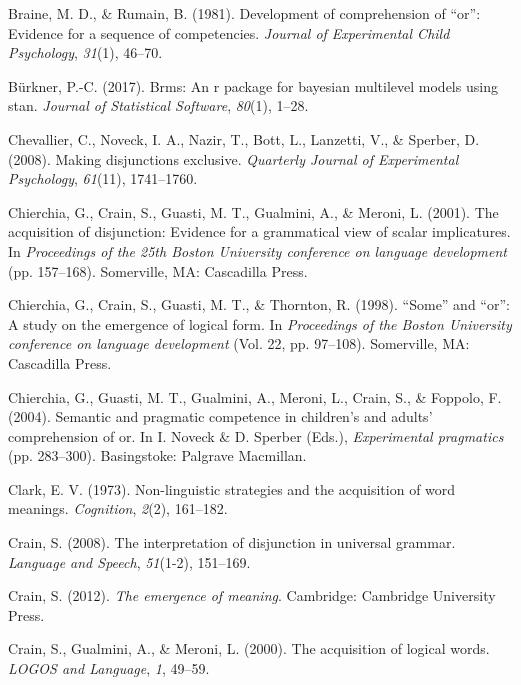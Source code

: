 \documentclass[
  english,
  ,man,floatsintext]{apa6}
\begin{document}
\leavevmode\hypertarget{ref-braine1981development}{}%
Braine, M. D., \& Rumain, B. (1981). Development of comprehension of ``or'': Evidence for a sequence of competencies. \emph{Journal of Experimental Child Psychology}, \emph{31}(1), 46--70.

\leavevmode\hypertarget{ref-burkner2017brms}{}%
Bürkner, P.-C. (2017). Brms: An r package for bayesian multilevel models using stan. \emph{Journal of Statistical Software}, \emph{80}(1), 1--28.

\leavevmode\hypertarget{ref-chevallier2008making}{}%
Chevallier, C., Noveck, I. A., Nazir, T., Bott, L., Lanzetti, V., \& Sperber, D. (2008). Making disjunctions exclusive. \emph{Quarterly Journal of Experimental Psychology}, \emph{61}(11), 1741--1760.

\leavevmode\hypertarget{ref-chierchia2001acquisition}{}%
Chierchia, G., Crain, S., Guasti, M. T., Gualmini, A., \& Meroni, L. (2001). The acquisition of disjunction: Evidence for a grammatical view of scalar implicatures. In \emph{Proceedings of the 25th Boston University conference on language development} (pp. 157--168). Somerville, MA: Cascadilla Press.

\leavevmode\hypertarget{ref-chierchia1998some}{}%
Chierchia, G., Crain, S., Guasti, M. T., \& Thornton, R. (1998). ``Some'' and ``or'': A study on the emergence of logical form. In \emph{Proceedings of the Boston University conference on language development} (Vol. 22, pp. 97--108). Somerville, MA: Cascadilla Press.

\leavevmode\hypertarget{ref-chierchia2004semantic}{}%
Chierchia, G., Guasti, M. T., Gualmini, A., Meroni, L., Crain, S., \& Foppolo, F. (2004). Semantic and pragmatic competence in children's and adults' comprehension of or. In I. Noveck \& D. Sperber (Eds.), \emph{Experimental pragmatics} (pp. 283--300). Basingstoke: Palgrave Macmillan.

\leavevmode\hypertarget{ref-clark1973non}{}%
Clark, E. V. (1973). Non-linguistic strategies and the acquisition of word meanings. \emph{Cognition}, \emph{2}(2), 161--182.

\leavevmode\hypertarget{ref-crain2008interpretation}{}%
Crain, S. (2008). The interpretation of disjunction in universal grammar. \emph{Language and Speech}, \emph{51}(1-2), 151--169.

\leavevmode\hypertarget{ref-crain2012emergence}{}%
Crain, S. (2012). \emph{The emergence of meaning}. Cambridge: Cambridge University Press.

\leavevmode\hypertarget{ref-crain2000acquisition}{}%
Crain, S., Gualmini, A., \& Meroni, L. (2000). The acquisition of logical words. \emph{LOGOS and Language}, \emph{1}, 49--59.
\end{document}
